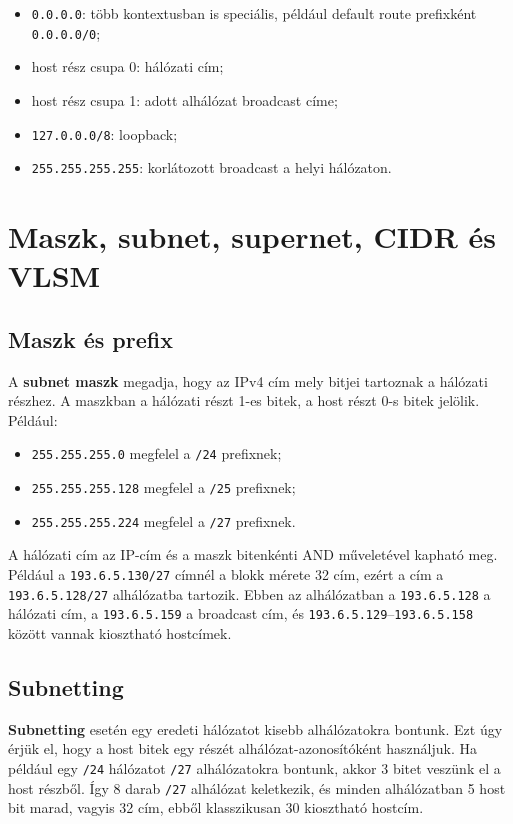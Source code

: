 \begin{itemize}
  \item \texttt{0.0.0.0}: több kontextusban is speciális, például default route prefixként \texttt{0.0.0.0/0};
  \item host rész csupa 0: hálózati cím;
  \item host rész csupa 1: adott alhálózat broadcast címe;
  \item \texttt{127.0.0.0/8}: loopback;
  \item \texttt{255.255.255.255}: korlátozott broadcast a helyi hálózaton.
\end{itemize}

\section{Maszk, subnet, supernet, CIDR és VLSM}

\subsection{Maszk és prefix}

A \textbf{subnet maszk} megadja, hogy az IPv4 cím mely bitjei tartoznak a hálózati részhez. A maszkban a hálózati részt 1-es bitek, a host részt 0-s bitek jelölik. Például:

\begin{itemize}
  \item \texttt{255.255.255.0} megfelel a \texttt{/24} prefixnek;
  \item \texttt{255.255.255.128} megfelel a \texttt{/25} prefixnek;
  \item \texttt{255.255.255.224} megfelel a \texttt{/27} prefixnek.
\end{itemize}

A hálózati cím az IP-cím és a maszk bitenkénti AND műveletével kapható meg. Például a \texttt{193.6.5.130/27} címnél a blokk mérete 32 cím, ezért a cím a \texttt{193.6.5.128/27} alhálózatba tartozik. Ebben az alhálózatban a \texttt{193.6.5.128} a hálózati cím, a \texttt{193.6.5.159} a broadcast cím, és \texttt{193.6.5.129}--\texttt{193.6.5.158} között vannak kiosztható hostcímek.

\subsection{Subnetting}

\textbf{Subnetting} esetén egy eredeti hálózatot kisebb alhálózatokra bontunk. Ezt úgy érjük el, hogy a host bitek egy részét alhálózat-azonosítóként használjuk. Ha például egy \texttt{/24} hálózatot \texttt{/27} alhálózatokra bontunk, akkor 3 bitet veszünk el a host részből. Így 8 darab \texttt{/27} alhálózat keletkezik, és minden alhálózatban 5 host bit marad, vagyis 32 cím, ebből klasszikusan 30 kiosztható hostcím.

